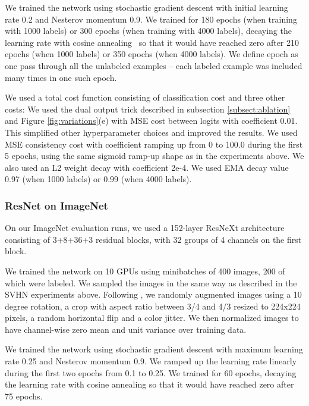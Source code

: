 \documentclass{article}
\begin{document}
We trained the network using stochastic gradient descent with initial learning rate 0.2 and Nesterov momentum 0.9.
We trained for 180 epochs (when training with 1000 labels) or 300 epochs (when training with 4000 labels), decaying the learning rate with cosine annealing~\citep{loshchilov_sgdr:_2016} so that it would have reached zero after 210 epochs (when 1000 labels) or 350 epochs (when 4000 labels).
We define epoch as one pass through all the unlabeled examples – each labeled example was included many times in one such epoch.

We used a total cost function consisting of classification cost and three other costs:
We used the dual output trick described in subsection \ref{subsect:ablation} and Figure \ref{fig:variations}(e) with MSE cost between logits with coefficient 0.01.
This simplified other hyperparameter choices and improved the results.
We used MSE consistency cost with coefficient ramping up from 0 to 100.0 during the first 5 epochs, using the same sigmoid ramp-up shape as in the experiments above.
We also used an L2 weight decay with coefficient 2e-4.
We used EMA decay value 0.97 (when 1000 labels) or 0.99 (when 4000 labels).

\subsubsection{ResNet on ImageNet}

On our ImageNet evaluation runs, we used a 152-layer ResNeXt architecture~\citep{xie_aggregated_2016} consisting of 3+8+36+3 residual blocks, with 32 groups of 4 channels on the first block.

We trained the network on 10 GPUs using minibatches of 400 images, 200 of which were labeled.
We sampled the images in the same way as described in the SVHN experiments above.
Following \citep{hu_squeeze-and-excitation_2017}, we randomly augmented images using a 10 degree rotation, a crop with aspect ratio between 3/4 and 4/3 resized to 224x224 pixels, a random horizontal flip and a color jitter.
We then normalized images to have channel-wise zero mean and unit variance over training data.

We trained the network using stochastic gradient descent with maximum learning rate 0.25 and Nesterov momentum 0.9.
We ramped up the learning rate linearly during the first two epochs from 0.1 to 0.25.
We trained for 60 epochs, decaying the learning rate with cosine annealing so that it would have reached zero after 75 epochs.
\end{document}
